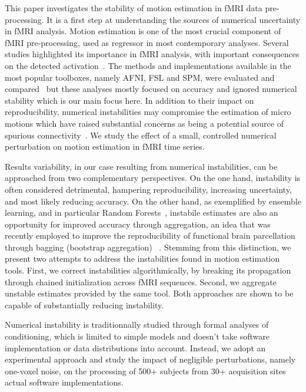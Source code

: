 \documentclass[11pt]{IEEEtran}
\begin{document}
 This paper investigates the stability of motion estimation in fMRI data
 pre-processing. It is a first step at understanding the sources of
 numerical uncertainty in fMRI analysis. Motion estimation is one of the
 most crucial component of fMRI pre-processing, used as regressor in most
 contemporary analyses. Several studies highlighted its importance in fMRI
 analysis, with important consequences on the detected
 activation~\cite{OAKES2005529}.
 The methods and implementations available in the most popular toolboxes,
 namely AFNI, FSL and SPM, were evaluated and compared~\cite{OAKES2005529, comparisons}
 but these analyses mostly focused on accuracy and ignored numerical
 stability which is our main focus here. In addition to their impact on
 reproducibility, numerical instabilities may compromise the estimation of
 micro motions which have raised substantial concerns as being a potential
 source of spurious connectivity~\cite{power2012spurious}. We study the
 effect of a small, controlled numerical perturbation on motion estimation
 in fMRI time series.

 Results variability, in our case resulting from numerical instabilities,
 can be approached from two complementary perspectives. On the one hand,
 instability is often considered detrimental, hampering reproducibility,
 increasing uncertainty, and most likely reducing accuracy. On the other
 hand, as exemplified by ensemble learning, and in particular Random
 Forests~\cite{breiman1996bagging, breiman2001random},  
 instabile estimates are also an opportunity for improved accuracy through
 aggregation, an idea that was recently employed to improve the
 reproducibility of functional brain parcellation through bagging
 (bootstrap aggregation)
 ~\cite{NIKOLAIDIS2020116678}.
 Stemming from this distinction, we present two attempts to address the
 instabilities found in motion estimation tools. First, we correct
 instabilities algorithmically, by breaking its propagation through chained
 initialization across fMRI sequences. Second, we aggregate unstable
 estimates provided by the same tool. Both approaches are shown to be
 capable of substantially reducing instability.

 Numerical instability is traditionnally studied through formal analyses of
 conditioning, which is limited to simple models and doesn't take software
 implementation or data distributions into account. Instead, we adopt an
 experimental approach and study the impact of negligible perturbations,
 namely one-voxel noise, on the processing of 500+ subjects from 30+
 acquisition sites actual software implementations.
 
\end{document}
